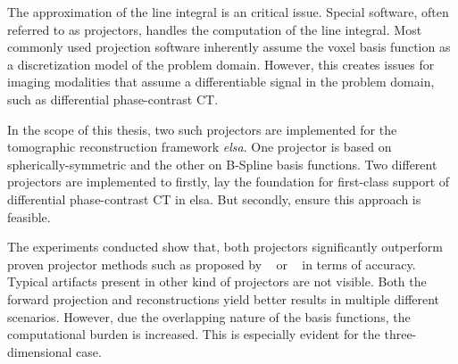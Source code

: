The approximation of the line integral is an critical issue. Special software, often referred to as
projectors, handles the computation of the line integral. Most commonly used projection software
inherently assume the voxel basis function as a discretization model of the problem domain. However,
this creates issues for imaging modalities that assume a differentiable signal in the problem
domain, such as differential phase-contrast CT\@.

In the scope of this thesis, two such projectors are implemented for the tomographic reconstruction
framework \textit{elsa}. One projector is based on spherically-symmetric and the other on B-Spline
basis functions. Two different projectors are implemented to firstly, lay the foundation for
first-class support of differential phase-contrast CT in elsa. But secondly, ensure this approach is
feasible.

The experiments conducted show that, both projectors significantly outperform proven projector
methods such as proposed by \citeauthor*{siddon_fast_1985}~\cite{siddon_fast_1985} or
\citeauthor*{joseph_improved_1982}~\cite{joseph_improved_1982} in terms of accuracy. Typical
artifacts present in other kind of projectors are not visible. Both the forward projection and
reconstructions yield better results in multiple different scenarios. However, due the overlapping
nature of the basis functions, the computational burden is increased. This is especially evident for
the three-dimensional case.
